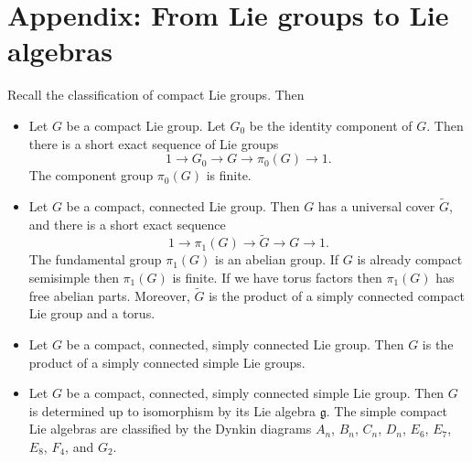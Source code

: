 \documentclass[12pt]{article}
\begin{document}
\section{Appendix: From Lie groups to Lie algebras}
Recall the classification of compact Lie groups. Then \begin{itemize}
    \item Let $G$ be a compact Lie group. Let $G_0$ be the identity component of $G$. Then there is a short exact sequence of Lie groups
          \[1 \to G_0 \to G \to \pi_0(G) \to 1.\]
          The component group $\pi_0(G)$ is finite.
    \item Let $G$ be a compact, connected Lie group. Then $G$ has a universal cover $\tilde{G}$, and there is a short exact sequence
          \[1 \to \pi_1(G) \to \tilde{G} \to G \to 1.\]
          The fundamental group $\pi_1(G)$ is an abelian group. If $G$ is already compact semisimple then $\pi_1(G)$ is finite. If we have torus factors then $\pi_1(G)$ has free abelian parts.
          Moreover, $\tilde G$ is the product of a simply connected compact Lie group and a torus.
    \item Let $G$ be a compact, connected, simply connected Lie group. Then $G$ is the product of a simply connected simple Lie groups.
    \item Let $G$ be a compact, connected, simply connected simple Lie group. Then $G$ is determined up to isomorphism by its Lie algebra $\mathfrak g$. The simple compact Lie algebras are classified by the Dynkin diagrams $A_n$, $B_n$, $C_n$, $D_n$, $E_6$, $E_7$, $E_8$, $F_4$, and $G_2$.
\end{itemize}
\end{document}
